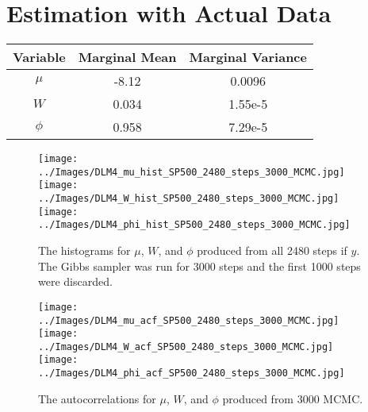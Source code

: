 \documentclass{article}
\begin{document}
\newpage
\newpage
\newpage
\newpage
\newpage
\newpage
\newpage

\section{Estimation with Actual Data}

\begin{comment}
Using data my Time Series class I calibrated our Part IV model using S\&P data from Jan. 04, 1999 to May 27, 1999.

\begin{figure}[!h]
\texttt{[image: ../Images/returns\_sp\_test.jpg]}
\texttt{[image: ../Images/phi\_test.jpg]}

\texttt{[image: ../Images/mu\_test.jpg]}
\texttt{[image: ../Images/W\_test.jpg]}
\end{figure}
\end{comment}

\begin{center}
\begin{tabular}{c | c | c}
Variable & Marginal Mean & Marginal Variance \\
\hline
$\mu$ & -8.12 & 0.0096 \\
$W$ & 0.034 & 1.55e-5 \\
$\phi$ & 0.958 & 7.29e-5 \\
\end{tabular}
\end{center}

\begin{figure}[!h]
\begin{center}
\texttt{[image: ../Images/DLM4\_mu\_hist\_SP500\_2480\_steps\_3000\_MCMC.jpg]}
\texttt{[image: ../Images/DLM4\_W\_hist\_SP500\_2480\_steps\_3000\_MCMC.jpg]}
\texttt{[image: ../Images/DLM4\_phi\_hist\_SP500\_2480\_steps\_3000\_MCMC.jpg]}
\end{center}
\label{DLM4:histograms}
\caption{The histograms for $\mu$, $W$, and $\phi$ produced from all 2480 steps if $y$.  The Gibbs sampler was run for 3000 steps and the first 1000 steps were discarded.}
\end{figure}

\begin{figure}[!h]
\begin{center}
\texttt{[image: ../Images/DLM4\_mu\_acf\_SP500\_2480\_steps\_3000\_MCMC.jpg]}
\texttt{[image: ../Images/DLM4\_W\_acf\_SP500\_2480\_steps\_3000\_MCMC.jpg]}
\texttt{[image: ../Images/DLM4\_phi\_acf\_SP500\_2480\_steps\_3000\_MCMC.jpg]}
\end{center}
\label{DLM4:histograms}
\caption{The autocorrelations for $\mu$, $W$, and $\phi$ produced from  3000 MCMC.}
\end{figure}
\end{document}
